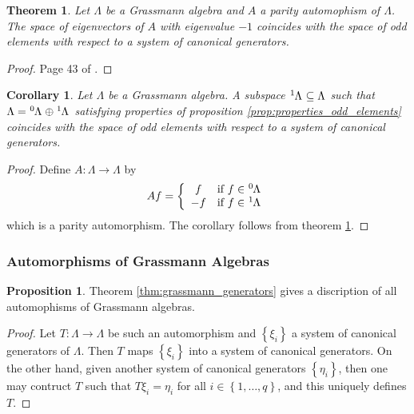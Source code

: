 \documentclass{article}
\newtheorem{theorem}{Theorem}
\newtheorem{corollary}{Corollary}[theorem]
\theoremstyle{definition}
\newtheorem{proposition}{Proposition}
\begin{document}
\begin{theorem}
    \label{thm:parity_aut_generators}
    Let $\Lambda$ be a Grassmann algebra and $A$ a parity automophism of $\Lambda$. The space of eigenvectors of $A$ with eigenvalue $-1$ coincides with the space of odd elements with respect to a system of canonical generators.
\end{theorem}
\begin{proof}
    Page 43 of \cite{berezin_introduction_1987}.
\end{proof}

\begin{corollary}
    Let $\Lambda$ be a Grassmann algebra. A subspace $\tensor[^1]{\Lambda}{} \subseteq \Lambda$ such that $\Lambda = \tensor[^0]{\Lambda}{} \oplus \tensor[^1]{\Lambda}{}$ satisfying properties of proposition \ref{prop:properties_odd_elements} coincides with the space of odd elements with respect to a system of canonical generators.
\end{corollary}
\begin{proof}
    Define $A: \Lambda \rightarrow \Lambda$ by
    \begin{equation*}
        Af = \left\{
        \begin{array}{cr}
            f & \text{if } f \in \tensor[^0]{\Lambda}{} \\
            -f & \text{if } f \in \tensor[^1]{\Lambda}{}
        \end{array} \right.
    \end{equation*}
    which is a parity automorphism. The corollary follows from theorem \ref{thm:parity_aut_generators}.
\end{proof}


\subsubsection{Automorphisms of Grassmann Algebras}

\begin{proposition}
    Theorem \ref{thm:grassmann_generators} gives a discription of all automophisms of Grassmann algebras.
\end{proposition}
\begin{proof}
    Let $T: \Lambda \rightarrow \Lambda$ be such an automorphism and $\left\{ \xi_i \right\}$ a system of canonical generators of $\Lambda$. Then $T$ maps $\left\{ \xi_i \right\}$ into a system of canonical generators. On the other hand, given another system of canonical generators $\left\{ \eta_i \right\}$, then one may contruct $T$ such that $T \xi_i = \eta_i$ for all $i \in \left\{ 1, \dots, q \right\}$, and this uniquely defines $T$.
\end{proof}
\end{document}
